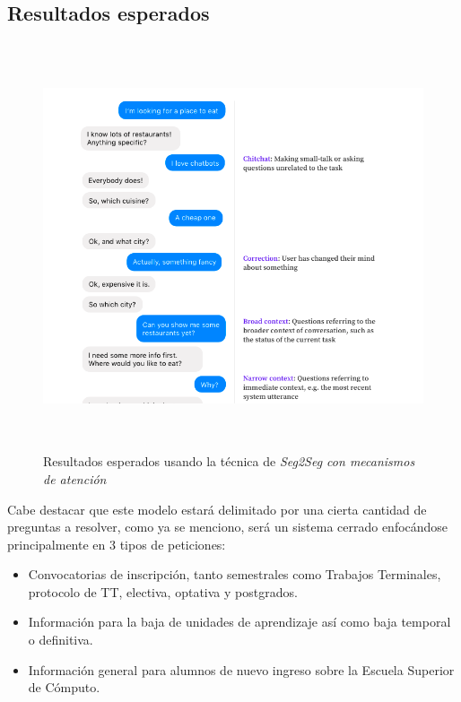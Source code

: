     \subsection{Resultados esperados}
        \begin{figure}[H]
             \centering
             \includegraphics[height=12cm, width=16.5cm]{Latex/Classes/Imagenes/hola.png}
             \caption{Resultados esperados usando la técnica de \it{Seg2Seg} con mecanismos de atención}
              \label{fig:infraestructuraExtraccionNLP}
        \end{figure}
        
    Cabe destacar que este modelo estará delimitado por una cierta cantidad de preguntas a resolver, como ya se menciono, será un sistema cerrado enfocándose principalmente en 3 tipos de peticiones:
    
    \begin{itemize}
        \item Convocatorias de inscripción, tanto semestrales como Trabajos Terminales, protocolo de TT, electiva, optativa y postgrados.
        \item Información para la baja de unidades de aprendizaje así como baja temporal o definitiva.
        \item Información general para alumnos de nuevo ingreso sobre la Escuela Superior de Cómputo.
    \end{itemize}
